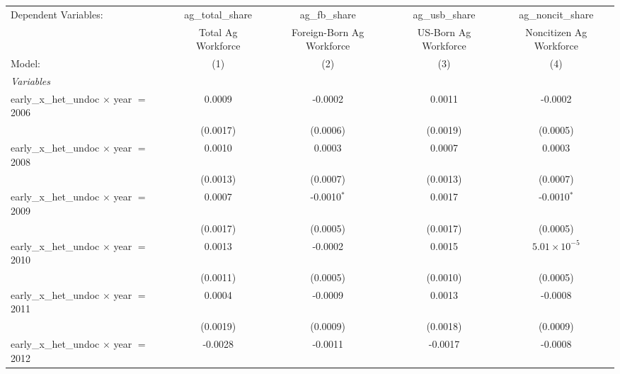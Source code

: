 
\begingroup
\centering
\begin{tabular}{lcccc}
   \tabularnewline \midrule \midrule
   Dependent Variables:                            & ag\_total\_share   & ag\_fb\_share             & ag\_usb\_share         & ag\_noncit\_share\\    
                                                   & Total Ag Workforce & Foreign-Born Ag Workforce & US-Born Ag Workforce   & Noncitizen Ag Workforce \\   
   Model:                                          & (1)                & (2)                       & (3)                    & (4)\\  
   \midrule
   \emph{Variables}\\
   early\_x\_het\_undoc $\times$ year $=$ 2006     & 0.0009             & -0.0002                   & 0.0011                 & -0.0002\\   
                                                   & (0.0017)           & (0.0006)                  & (0.0019)               & (0.0005)\\   
   early\_x\_het\_undoc $\times$ year $=$ 2008     & 0.0010             & 0.0003                    & 0.0007                 & 0.0003\\   
                                                   & (0.0013)           & (0.0007)                  & (0.0013)               & (0.0007)\\   
   early\_x\_het\_undoc $\times$ year $=$ 2009     & 0.0007             & -0.0010$^{*}$             & 0.0017                 & -0.0010$^{*}$\\   
                                                   & (0.0017)           & (0.0005)                  & (0.0017)               & (0.0005)\\   
   early\_x\_het\_undoc $\times$ year $=$ 2010     & 0.0013             & -0.0002                   & 0.0015                 & $5.01\times 10^{-5}$\\    
                                                   & (0.0011)           & (0.0005)                  & (0.0010)               & (0.0005)\\   
   early\_x\_het\_undoc $\times$ year $=$ 2011     & 0.0004             & -0.0009                   & 0.0013                 & -0.0008\\   
                                                   & (0.0019)           & (0.0009)                  & (0.0018)               & (0.0009)\\   
   early\_x\_het\_undoc $\times$ year $=$ 2012     & -0.0028            & -0.0011                   & -0.0017                & -0.0008\\   

\end{tabular}
